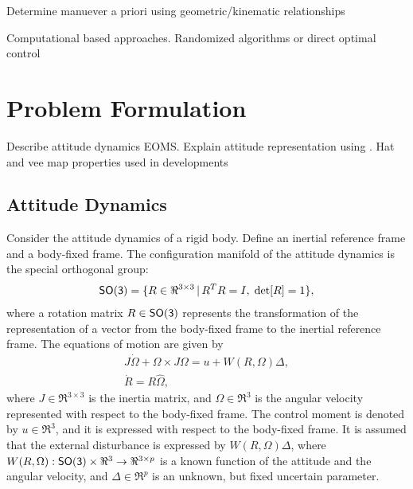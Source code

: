 \documentclass[letterpaper, 10 pt, conference]{ieeeconf}  %
\begin{document}
Determine manuever a priori using geometric/kinematic relationships

Computational based approaches.
Randomized algorithms or direct optimal control

\section{Problem Formulation}

Describe attitude dynamics EOMS.
Explain attitude representation using \SO.
Hat and vee map properties used in developments

\subsection{Attitude Dynamics}
Consider the attitude dynamics of a rigid body. Define an inertial reference frame and a body-fixed frame. The configuration manifold of the attitude dynamics is the special orthogonal group:
\begin{align*}
\mathsf{SO(3)} = \{R\in\Re^{3\times 3}\,|\, R^TR=I,\;\mathrm{det}[R]=1\},
\end{align*}
where a rotation matrix $R\in\mathsf{SO(3)}$ represents the transformation of the representation of a vector from the body-fixed frame to the inertial reference frame. The equations of motion are given by
\begin{gather}
J\dot\Omega + \Omega\times J\Omega = u+W(R,\Omega)\Delta,\label{eqn:Wdot}\\
\dot R = R\hat\Omega,\label{eqn:Rdot}
\end{gather}
where $J\in\Re^{3\times 3}$ is the inertia matrix, and $\Omega\in\Re^3$ is the angular velocity represented with respect to the body-fixed frame. The control moment is denoted by $u\in\Re^3$, and it is expressed with respect to the body-fixed frame. It is assumed that the external disturbance is expressed by $W(R,\Omega)\Delta$, where $W(R,\Omega):\mathsf{SO(3)}\times\Re^3\rightarrow \Re^{3\times p}$ is a known function of the attitude and the angular velocity, and $\Delta\in\Re^p$ is an unknown, but fixed uncertain parameter.
\end{document}
